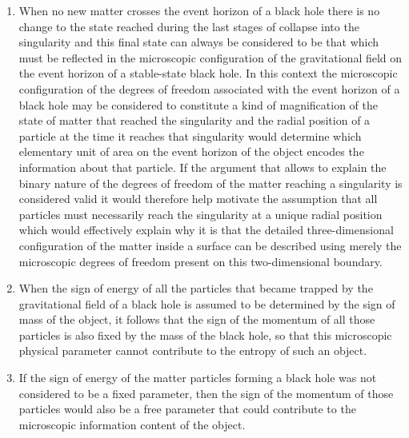 \documentclass[notitlepage,12pt]{report}
\begin{document}
\begin{enumerate}
\item When no new matter crosses the event horizon of a black hole there is no change to the state reached during the last stages of collapse into the singularity and this final state can always be considered to be that which must be reflected in the microscopic configuration of the gravitational field on the event horizon of a stable-state black hole. In this context the microscopic configuration of the degrees of freedom associated with the event horizon of a black hole may be considered to constitute a kind of magnification of the state of matter that reached the singularity and the radial position of a particle at the time it reaches that singularity would determine which elementary unit of area on the event horizon of the object encodes the information about that particle. If the argument that allows to explain the binary nature of the degrees of freedom of the matter reaching a singularity is considered valid it would therefore help motivate the assumption that all particles must necessarily reach the singularity at a unique radial position which would effectively explain why it is that the detailed three-dimensional configuration of the matter inside a surface can be described using merely the microscopic degrees of freedom present on this two-dimensional boundary.

\item When the sign of energy of all the particles that became trapped by the gravitational field of a black hole is assumed to be determined by the sign of mass of the object, it follows that the sign of the momentum of all those particles is also fixed by the mass of the black hole, so that this microscopic physical parameter cannot contribute to the entropy of such an object.

\item If the sign of energy of the matter particles forming a black hole was not considered to be a fixed parameter, then the sign of the momentum of those particles would also be a free parameter that could contribute to the microscopic information content of the object.


\end{enumerate}
\end{document}
